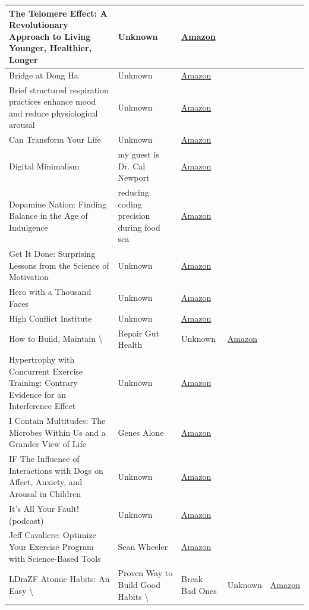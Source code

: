 \documentclass{article}
\begin{document}
\begin{longtable}{|p{8cm}|p{4cm}|p{2.5cm}|}
\hline
The Telomere Effect: A Revolutionary Approach to Living Younger, Healthier, Longer & Unknown & \href{https://amzn.to/3m4zERB}{Amazon} \\
\hline
Bridge at Dong Ha & Unknown & \href{https://amzn.to/4cQuyxJ}{Amazon} \\
\hline
Brief structured respiration practices enhance mood and reduce physiological arousal & Unknown & \href{https://amzn.to/3RwnhdV}{Amazon} \\
\hline
Can Transform Your Life & Unknown & \href{https://amzn.to/3Kailra}{Amazon} \\
\hline
Digital Minimalism & my guest is Dr. Cal Newport & \href{https://amzn.to/48IYJ6U}{Amazon} \\
\hline
Dopamine Nation: Finding Balance in the Age of Indulgence & reducing coding precision during food sca & \href{https://amzn.to/3ipnI7o}{Amazon} \\
\hline
Get It Done: Surprising Lessons from the Science of Motivation & Unknown & \href{https://amzn.to/3q3u1VN}{Amazon} \\
\hline
Hero with a Thousand Faces & Unknown & \href{https://amzn.to/3xuzwQH}{Amazon} \\
\hline
High Conflict Institute & Unknown & \href{https://amzn.to/48lNRNN}{Amazon} \\
\hline
How to Build, Maintain \textbackslash{}& Repair Gut Health & Unknown & \href{https://amzn.to/4bBFHSo}{Amazon} \\
\hline
Hypertrophy with Concurrent Exercise Training: Contrary Evidence for an Interference Effect & Unknown & \href{https://amzn.to/2D22cR9}{Amazon} \\
\hline
I Contain Multitudes: The Microbes Within Us and a Grander View of Life & Genes Alone & \href{https://amzn.to/3M2CY9B}{Amazon} \\
\hline
IF
The Influence of Interactions with Dogs on Affect, Anxiety, and Arousal in Children & Unknown & \href{https://amzn.to/3A9S4UY}{Amazon} \\
\hline
It’s All Your Fault! (podcast) & Unknown & \href{https://amzn.to/40lTU2J}{Amazon} \\
\hline
Jeff Cavaliere: Optimize Your Exercise Program with Science-Based Tools & Sean Wheeler & \href{https://amzn.to/3JBR54b}{Amazon} \\
\hline
LDmZF
Atomic Habits: An Easy \textbackslash{}& Proven Way to Build Good Habits \textbackslash{}& Break Bad Ones & Unknown & \href{https://amzn.to/3ahSLkX}{Amazon} \\

\end{longtable}
\end{document}
